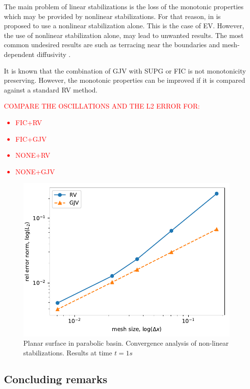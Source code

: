 The main problem of linear stabilizations is the loss of the monotonic properties which may be provided by nonlinear stabilizations. For that reason, in \cite{guermond2011} is proposed to use a nonlinear stabilization alone. This is the case of EV.
However, the use of nonlinear stabilization alone, may lead to unwanted results. The most common undesired results are such as terracing near the boundaries \cite{lohner2008ch9,kuzmin2005b} and mesh-dependent diffusivity \cite{badia2014}.

It is known that the combination of GJV with SUPG or FIC is not monotonicity preserving. However, the monotonic properties can be improved if it is compared against a standard RV method.




\textcolor{red}{COMPARE THE OSCILLATIONS AND THE L2 ERROR FOR:
\begin{itemize}
\item FIC+RV
\item FIC+GJV
\item NONE+RV
\item NONE+GJV
\end{itemize}
}


\begin{figure}
    \centering
    \includegraphics[width=.7\textwidth]{img/eulerian/gjv/gjv_rv_parabola_convergence.pdf}
    \caption{Planar surface in parabolic basin. Convergence analysis of non-linear stabilizations. Results at time $t=1s$}
    \label{gjv_rv_parabola_converence}
\end{figure}



\subsection{Concluding remarks}











